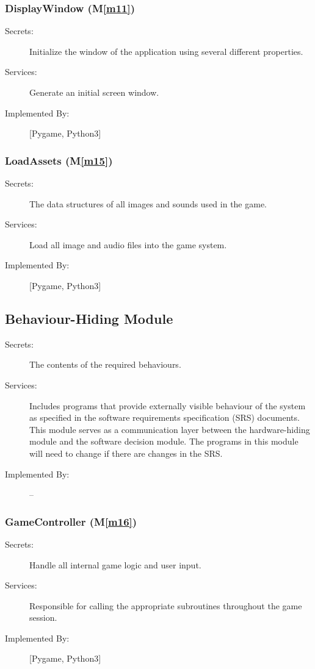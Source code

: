 \documentclass[12pt, titlepage]{article}
\newcommand{\mref}[1]{M\ref{#1}}
\begin{document}
\subsubsection{DisplayWindow (\mref{m11})}
\begin{description}
\item[Secrets:] Initialize the window of the application using several different properties.
\item[Services:] Generate an initial screen window. 
\item[Implemented By:] [Pygame, Python3]
\end{description}

\subsubsection{LoadAssets (\mref{m15})}
\begin{description}
\item[Secrets:] The data structures of all images and sounds used in the game.
\item[Services:] Load all image and audio files into the game system.
\item[Implemented By:] [Pygame, Python3]
\end{description}

\subsection{Behaviour-Hiding Module}

\begin{description}
\item[Secrets:]The contents of the required behaviours.
\item[Services:]Includes programs that provide externally visible behaviour of
  the system as specified in the software requirements specification (SRS)
  documents. This module serves as a communication layer between the
  hardware-hiding module and the software decision module. The programs in this
  module will need to change if there are changes in the SRS.
\item[Implemented By:] --
\end{description}

\subsubsection{GameController (\mref{m16})}
\begin{description}
\item[Secrets:] Handle all internal game logic and user input.
\item[Services:] Responsible for calling the appropriate subroutines throughout the game session. 
\item[Implemented By:] [Pygame, Python3]
\end{description}
\end{document}
